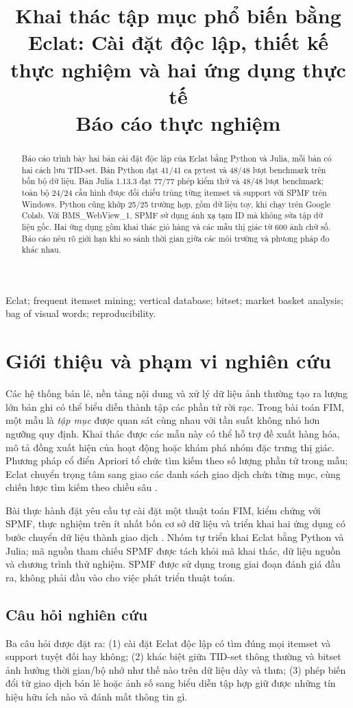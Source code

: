 \documentclass[conference,10pt]{IEEEtran}
\title{Khai thác tập mục phổ biến bằng Eclat: Cài đặt độc lập, thiết kế thực nghiệm và hai ứng dụng thực tế\\[2mm]
\large Báo cáo thực nghiệm}
\author{
\IEEEauthorblockN{%
\begin{tabular}{@{}c@{\hspace{18mm}}c@{}}
Thiều Quang & Tôn Thất Việt Khoa\\
{\normalfont\small MSSV: 24127114} & {\normalfont\small MSSV: 24127190}
\end{tabular}}
\IEEEauthorblockA{Trường Đại học Khoa học Tự nhiên, ĐHQG-HCM\\Học phần: Khai thác dữ liệu và ứng dụng\\(Data Mining and Applications)}
}
\begin{document}
\maketitle
\begin{abstract}
Báo cáo trình bày hai bản cài đặt độc lập của Eclat bằng Python và Julia, mỗi bản có hai cách lưu TID-set. Bản Python đạt 41/41 ca pytest và 48/48 lượt benchmark trên bốn bộ dữ liệu. Bản Julia 1.13.3 đạt 77/77 phép kiểm thử và 48/48 lượt benchmark; toàn bộ 24/24 cấu hình được đối chiếu trùng từng itemset và support với SPMF trên Windows. Python cũng khớp 25/25 trường hợp, gồm dữ liệu toy, khi chạy trên Google Colab. Với BMS\_WebView\_1, SPMF sử dụng ánh xạ tạm ID mà không sửa tập dữ liệu gốc. Hai ứng dụng gồm khai thác giỏ hàng và các mẫu thị giác từ 600 ảnh chữ số. Báo cáo nêu rõ giới hạn khi so sánh thời gian giữa các môi trường và phương pháp đo khác nhau.
\end{abstract}
\begin{IEEEkeywords}
Eclat; frequent itemset mining; vertical database; bitset; market basket analysis; bag of visual words; reproducibility.
\end{IEEEkeywords}

\section{Giới thiệu và phạm vi nghiên cứu}
Các hệ thống bán lẻ, nền tảng nội dung và xử lý dữ liệu ảnh thường tạo ra lượng lớn bản ghi có thể biểu diễn thành tập các phần tử rời rạc. Trong bài toán FIM, một mẫu là \emph{tập mục} được quan sát cùng nhau với tần suất không nhỏ hơn ngưỡng quy định. Khai thác được các mẫu này có thể hỗ trợ đề xuất hàng hóa, mô tả đồng xuất hiện của hoạt động hoặc khám phá nhóm đặc trưng thị giác. Phương pháp cổ điển Apriori tổ chức tìm kiếm theo số lượng phần tử trong mẫu; Eclat chuyển trọng tâm sang giao các danh sách giao dịch chứa từng mục, cùng chiến lược tìm kiếm theo chiều sâu \cite{zaki2000,agrawal1994}.

Bài thực hành đặt yêu cầu tự cài đặt một thuật toán FIM, kiểm chứng với SPMF, thực nghiệm trên ít nhất bốn cơ sở dữ liệu và triển khai hai ứng dụng có bước chuyển dữ liệu thành giao dịch \cite{assignment}. Nhóm tự triển khai Eclat bằng Python và Julia; mã nguồn tham chiếu SPMF được tách khỏi mã khai thác, dữ liệu nguồn và chương trình thử nghiệm. SPMF được sử dụng trong giai đoạn đánh giá đầu ra, không phải đầu vào cho việc phát triển thuật toán.

\subsection{Câu hỏi nghiên cứu}
Ba câu hỏi được đặt ra: (1) cài đặt Eclat độc lập có tìm đúng mọi itemset và support tuyệt đối hay không; (2) khác biệt giữa TID-set thông thường và bitset ảnh hưởng thời gian/bộ nhớ như thế nào trên dữ liệu dày và thưa; (3) phép biến đổi từ giao dịch bán lẻ hoặc ảnh số sang biểu diễn tập hợp giữ được những tín hiệu hữu ích nào và đánh mất thông tin gì.
\end{document}
